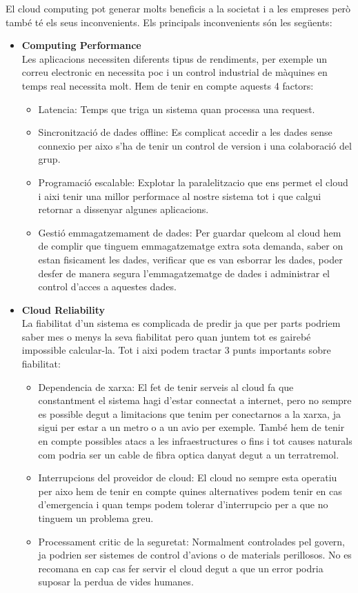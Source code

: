 \documentclass[a4paper, 10pt]{article}
\begin{document}
    El cloud computing pot generar molts beneficis a la societat i a les empreses però també té els seus inconvenients. Els principals inconvenients són les següents:
\begin{itemize}
    \item \textbf{Computing Performance}\\
    Les aplicacions necessiten diferents tipus de rendiments, per exemple un correu electronic en necessita poc i un control industrial de màquines en temps real necessita molt. Hem de tenir en compte aquests 4 factors:
    \begin{itemize}
        \item Latencia: Temps que triga un sistema quan processa una request.
        \item Sincronització de dades offline: Es complicat accedir a les dades sense connexio per aixo s'ha de tenir un control de version i una colaboració del grup.
        \item Programació escalable: Explotar la paralelitzacio que ens permet el cloud i aixi tenir una millor performace al nostre sistema tot i que calgui retornar a dissenyar algunes aplicacions.
        \item Gestió emmagatzemament de dades: Per guardar quelcom al cloud hem de complir que tinguem emmagatzematge extra sota demanda, saber on estan fisicament les dades, verificar que es van esborrar les dades, poder desfer de manera segura l'emmagatzematge de dades i administrar el control d'acces a aquestes dades.
    \end{itemize}
    
    \item \textbf{Cloud Reliability}\\
    La fiabilitat d'un sistema es complicada de predir ja que per parts podriem saber mes o menys la seva fiabilitat pero quan juntem tot es gairebé impossible calcular-la. Tot i aixi podem tractar 3 punts importants sobre fiabilitat:
    \begin{itemize}
        \item Dependencia de xarxa: El fet de tenir serveis al cloud fa que constantment el sistema hagi d'estar connectat a internet, pero no sempre es possible degut a limitacions que tenim per conectarnos a la xarxa, ja sigui per estar a un metro o a un avio per exemple. També hem de tenir en compte possibles atacs a les infraestructures o fins i tot causes naturals com podria ser un cable de fibra optica danyat degut a un terratremol.
        \item Interrupcions del proveidor de cloud: El cloud no sempre esta operatiu per aixo hem de tenir en compte quines alternatives podem tenir en cas d'emergencia i quan temps podem tolerar d'interrupcio per a que no tinguem un problema greu.
        \item Processament critic de la seguretat: Normalment controlades pel govern, ja podrien ser sistemes de control d'avions o de materials perillosos. No es recomana en cap cas fer servir el cloud degut a que un error podria suposar la perdua de vides humanes.
    \end{itemize}
    

\end{itemize}
\end{document}
